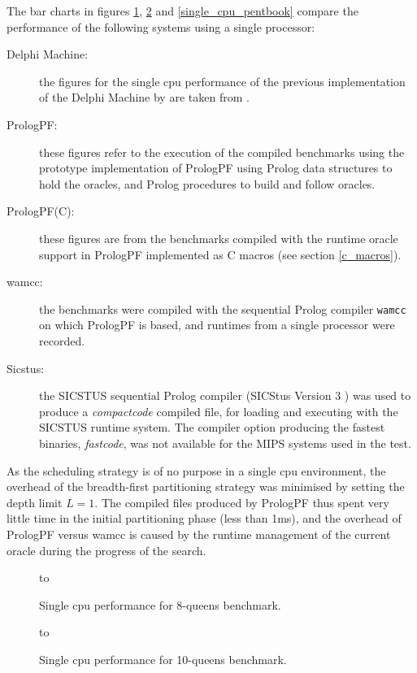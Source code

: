 The bar charts in figures \ref{single_cpu_queens8}, \ref{single_cpu_queens10}
and \ref{single_cpu_pentbook} compare the performance of the following
systems using a single processor:
\begin{description}
\item[Delphi Machine:]{ the figures for the single cpu performance of the
  previous implementation of the Delphi Machine by \cite{Kle91} are taken
  from \cite{Sar95}.}
\item[PrologPF:]{ these figures refer to the execution of the compiled
  benchmarks using the prototype implementation of PrologPF using Prolog
  data structures to hold the oracles, and Prolog procedures to build and
  follow oracles.}
\item[PrologPF(C):]{ these figures are from the benchmarks compiled
  with the runtime oracle support in PrologPF implemented as C macros
  (see section \ref{c_macros}).}
\item[wamcc:]{ the benchmarks were compiled with the sequential Prolog
  compiler \texttt{wamcc} on which PrologPF is based, and runtimes from
  a single processor were recorded.}
\item[Sicstus:]{ the SICSTUS sequential Prolog compiler
  (SICStus Version 3 \cite{BBP+94})
  was used to produce a \textit{compactcode} compiled file, for loading and
  executing with the SICSTUS runtime system.  The compiler option producing
  the fastest binaries,
  \textit{fastcode}, was not available for the MIPS systems used in the
  test.}
\end{description}

As the scheduling strategy is of no purpose
in a single cpu environment, the overhead of the 
breadth-first partitioning strategy was minimised by setting the depth
limit $L=1$.  The compiled files produced by PrologPF thus spent very little
time in the initial partitioning phase (less than 1ms), and the overhead of
PrologPF versus wamcc is caused by the runtime management of the current
oracle during the progress of the search.
\begin{figure}[htbp]
\vspace{5mm} \hbox to 
\caption{Single cpu performance for 8-queens benchmark.}
\vspace{5mm}
\label{single_cpu_queens8}
\end{figure}

\begin{figure}[htbp]
\vspace{5mm} \hbox to 
\caption{Single cpu performance for 10-queens benchmark.}
\vspace{5mm}
\label{single_cpu_queens10}
\end{figure}

